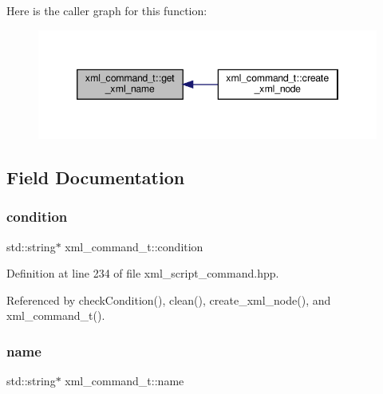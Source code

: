 Here is the caller graph for this function\+:
\nopagebreak
\begin{figure}[H]
\begin{center}
\leavevmode
\includegraphics[width=346pt]{d4/db0/classxml__command__t_a5d5ebe5a97c62b313c7190bb084fba87_icgraph}
\end{center}
\end{figure}


\subsection{Field Documentation}
\mbox{\label{classxml__command__t_a67299ab68dd3ee96452cf099cb5ddd69}} 
\subsubsection{\texorpdfstring{condition}{condition}}
{\footnotesize\ttfamily std\+::string$\ast$ xml\+\_\+command\+\_\+t\+::condition}



Definition at line 234 of file xml\+\_\+script\+\_\+command.\+hpp.



Referenced by check\+Condition(), clean(), create\+\_\+xml\+\_\+node(), and xml\+\_\+command\+\_\+t().

\mbox{\label{classxml__command__t_ac09e74dbd1ef3c41fcfaf3d19bbc8440}} 
\subsubsection{\texorpdfstring{name}{name}}
{\footnotesize\ttfamily std\+::string$\ast$ xml\+\_\+command\+\_\+t\+::name}



